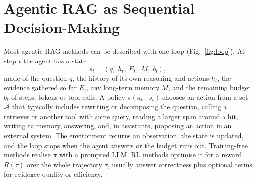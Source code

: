 \documentclass[pdflatex,sn-mathphys-num]{sn-jnl}%
\begin{document}
\section{Agentic RAG as Sequential Decision-Making}
\label{sec:formal}

Most agentic RAG methods can be described with one loop (Fig.~\ref{fig:loop}). At step $t$ the agent has a state
\begin{equation}
s_t = (q,\; h_t,\; E_t,\; M,\; b_t),
\end{equation}
made of the question $q$, the history of its own reasoning and actions $h_t$, the evidence gathered so far $E_t$, any long-term memory $M$, and the remaining budget $b_t$ of steps, tokens or tool calls. A policy $\pi(a_t \mid s_t)$ chooses an action from a set $\mathcal{A}$ that typically includes rewriting or decomposing the question, calling a retriever or another tool with some query, reading a larger span around a hit, writing to memory, answering, and, in assistants, proposing an action in an external system. The environment returns an observation, the state is updated, and the loop stops when the agent answers or the budget runs out. Training-free methods realise $\pi$ with a prompted LLM; RL methods optimise it for a reward $R(\tau)$ over the whole trajectory $\tau$, usually answer correctness plus optional terms for evidence quality or efficiency.
\end{document}
